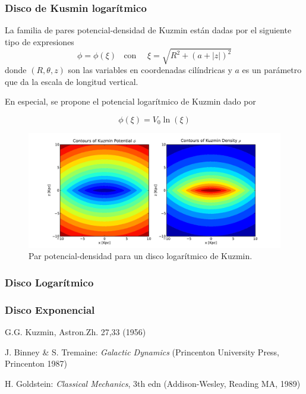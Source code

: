 \documentclass[10pt]{article}
\newcommand{\eq}[2]{\begin{equation} \label{eq#1} #2 \end{equation}}
\begin{document}
\subsubsection*{Disco de Kusmin logarítmico}
La familia de pares potencial-densidad de Kuzmin \cite{Kuzmin56} están dadas por el siguiente tipo de expresiones
\eq{3.2.1}
{\phi = \phi( \xi )\ \ \ \ \mbox{con}\ \ \ \ \ \ \xi = \sqrt{ R^2 + (a+ |z|)^2}}
donde $(R,\theta,z)$ son las variables en coordenadas cilíndricas y $a$ es un parámetro que da la escala de longitud vertical.

En especial, se propone el potencial logarítmico de Kuzmin dado por

\eq{3.2.2}
{ \phi(\xi) = V_0 \ln(\xi) }





  \begin{figure}[htbp]
	\centering
		\includegraphics[width=1.0\textwidth]{./figures/figure01.pdf}
	\caption{Par potencial-densidad para un disco logarítmico de Kuzmin.}
	\label{fig:Imagen01}
  \end{figure}
  

\subsubsection*{Disco Logarítmico}
\subsubsection*{Disco Exponencial}

\newpage


\begin{thebibliography}{}
  G.G. Kuzmin, Astron.Zh. 27,33 (1956)

 J. Binney \& S. Tremaine: \textit{Galactic Dynamics} (Princenton University Press, Princenton 1987)

 H. Goldstein: \textit{Classical Mechanics}, 3th edn (Addison-Wesley, Reading MA, 1989)
\end{thebibliography}
\end{document}
